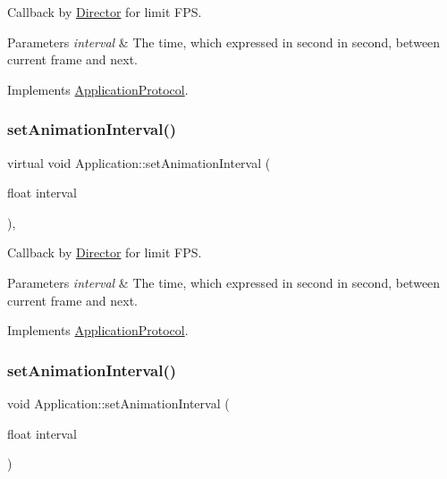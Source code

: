 Callback by \hyperlink{classDirector}{Director} for limit F\+PS. 


\begin{DoxyParams}{Parameters}
{\em interval} & The time, which expressed in second in second, between current frame and next. \\
\hline
\end{DoxyParams}


Implements \hyperlink{classApplicationProtocol_ac69ac0f01aaba7cc8654ec7cce4eb88f}{Application\+Protocol}.

\mbox{\label{classApplication_af04c472d3fac0d922d088896504925ac}} 
\subsubsection{\texorpdfstring{set\+Animation\+Interval()}{setAnimationInterval()}\hspace{0.1cm}{\footnotesize\ttfamily [4/12]}}
{\footnotesize\ttfamily virtual void Application\+::set\+Animation\+Interval (\begin{DoxyParamCaption}\item[{float}]{interval }\end{DoxyParamCaption})\hspace{0.3cm}{\ttfamily [override]}, {\ttfamily [virtual]}}



Callback by \hyperlink{classDirector}{Director} for limit F\+PS. 


\begin{DoxyParams}{Parameters}
{\em interval} & The time, which expressed in second in second, between current frame and next. \\
\hline
\end{DoxyParams}


Implements \hyperlink{classApplicationProtocol_ac69ac0f01aaba7cc8654ec7cce4eb88f}{Application\+Protocol}.

\mbox{\label{classApplication_a3160c4ee81ef7fba87d7299991998d5b}} 
\subsubsection{\texorpdfstring{set\+Animation\+Interval()}{setAnimationInterval()}\hspace{0.1cm}{\footnotesize\ttfamily [5/12]}}
{\footnotesize\ttfamily void Application\+::set\+Animation\+Interval (\begin{DoxyParamCaption}\item[{float}]{interval }\end{DoxyParamCaption})\hspace{0.3cm}{\ttfamily [virtual]}}



